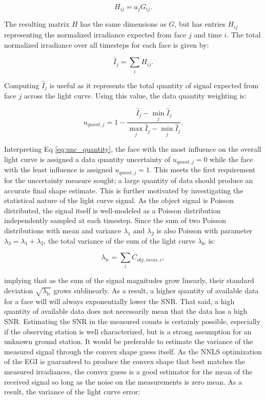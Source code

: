 \begin{equation} \label{eq:h_matrix}
  H_{ij} = a_j G_{ij}.
\end{equation}

The resulting matrix $H$ has the same dimensions as $G$, but has entries $H_{ij}$ representing the normalized irradiance expected from face $j$ and time $i$. The total normalized irradiance over all timesteps for each face is given by:

\begin{equation} \label{eq:total_norm_irrad}
  \hat{I}_{j} = \sum_{i}{H_{ij}}.
\end{equation}

Computing $\hat{I}_{j}$ is useful as it represents the total quantity of signal expected from face $j$ across the light curve. Using this value, the data quantity weighting is:

\begin{equation} \label{eq:unc_quantity}
  u_{quant,j} = 1 - \frac{\hat{I}_{j} - \min_{j}{\hat{I}_{j}}}{\max_{j}{\hat{I}_{j}} - \min_{j}{\hat{I}_{j}}}.
\end{equation}

Interpreting Eq \ref{eq:unc_quantity}, the face with the most influence on the overall light curve is assigned a data quantity uncertainty of $u_{quant,j} = 0$ while the face with the least influence is assigned $u_{quant,j} = 1$. This meets the first requirement for the uncertainty measure sought; a large quantity of data should produce an accurate final shape estimate. This is further motivated by investigating the statistical nature of the light curve signal. As the object signal is Poisson distributed, the signal itself is well-modeled as a Poisson distribution independently sampled at each timestep. Since the sum of two Poisson distributions with mean and variance $\lambda_1$ and $\lambda_2$ is also Poisson with parameter $\lambda_3 = \lambda_1 + \lambda_2$, the total variance of the sum of the light curve $\lambda_\mathrm{lc}$ is:

\begin{equation}
  \lambda_\mathrm{lc} = \sum_{i} C_{obj,meas,i},
\end{equation}

implying that as the sum of the signal magnitudes grow linearly, their standard deviation $\sqrt{\lambda_\mathrm{lc}}$ grows sublinearly. As a result, a higher quantity of available data for a face will will always exponentially lower the SNR. That said, a high quantity of available data does not necessarily mean that the data has a high SNR. Estimating the SNR in the measured counts is certainly possible, especially if the observing station is well characterized, but is a strong assumption for an unknown ground station. It would be preferable to estimate the variance of the measured signal through the convex shape guess itself. As the NNLS optimization of the EGI is guaranteed to produce the convex shape that best matches the measured irradiances, the convex guess is a good estimator for the mean of the received signal so long as the noise on the measurements is zero mean. As a result, the variance of the light curve error:

